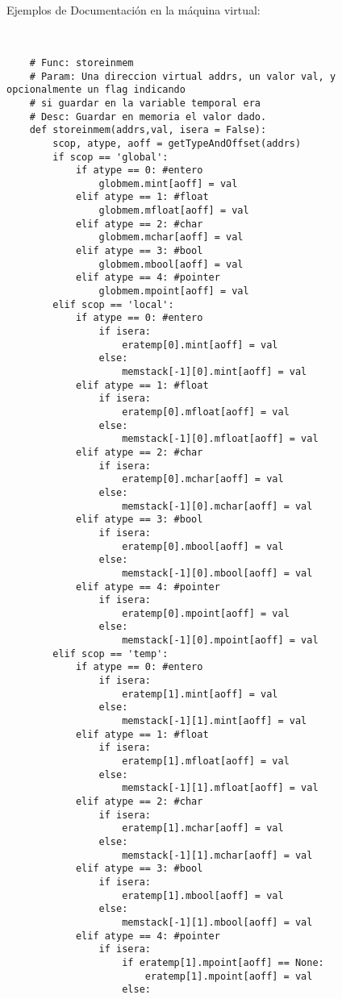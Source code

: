 \documentclass[krantz1,ChapterTOCs, spanish]{krantz}
\begin{document}
\begin{verbatim}
\end{verbatim}

\newpage
Ejemplos de Documentación en la máquina virtual:
\scriptsize
\begin{verbatim}
    
    
    # Func: storeinmem
    # Param: Una direccion virtual addrs, un valor val, y opcionalmente un flag indicando 
    # si guardar en la variable temporal era
    # Desc: Guardar en memoria el valor dado.
    def storeinmem(addrs,val, isera = False):
        scop, atype, aoff = getTypeAndOffset(addrs)
        if scop == 'global':
            if atype == 0: #entero
                globmem.mint[aoff] = val
            elif atype == 1: #float
                globmem.mfloat[aoff] = val
            elif atype == 2: #char
                globmem.mchar[aoff] = val
            elif atype == 3: #bool
                globmem.mbool[aoff] = val
            elif atype == 4: #pointer
                globmem.mpoint[aoff] = val
        elif scop == 'local':
            if atype == 0: #entero
                if isera:
                    eratemp[0].mint[aoff] = val
                else:
                    memstack[-1][0].mint[aoff] = val
            elif atype == 1: #float
                if isera:
                    eratemp[0].mfloat[aoff] = val
                else:
                    memstack[-1][0].mfloat[aoff] = val
            elif atype == 2: #char
                if isera:
                    eratemp[0].mchar[aoff] = val
                else:
                    memstack[-1][0].mchar[aoff] = val
            elif atype == 3: #bool
                if isera:
                    eratemp[0].mbool[aoff] = val
                else:
                    memstack[-1][0].mbool[aoff] = val
            elif atype == 4: #pointer
                if isera:
                    eratemp[0].mpoint[aoff] = val
                else:
                    memstack[-1][0].mpoint[aoff] = val
        elif scop == 'temp':
            if atype == 0: #entero
                if isera:
                    eratemp[1].mint[aoff] = val
                else:
                    memstack[-1][1].mint[aoff] = val
            elif atype == 1: #float
                if isera:
                    eratemp[1].mfloat[aoff] = val
                else:
                    memstack[-1][1].mfloat[aoff] = val
            elif atype == 2: #char
                if isera:
                    eratemp[1].mchar[aoff] = val
                else:
                    memstack[-1][1].mchar[aoff] = val
            elif atype == 3: #bool
                if isera:
                    eratemp[1].mbool[aoff] = val
                else:
                    memstack[-1][1].mbool[aoff] = val
            elif atype == 4: #pointer
                if isera:
                    if eratemp[1].mpoint[aoff] == None:
                        eratemp[1].mpoint[aoff] = val
                    else:
                        

\end{verbatim}
\end{document}

